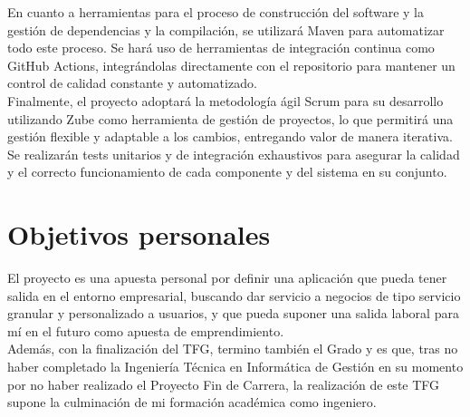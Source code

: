 En cuanto a herramientas para el proceso de construcción del software y la gestión de dependencias y la compilación, se utilizará Maven para automatizar todo este proceso. Se hará uso de herramientas de integración continua como GitHub Actions, integrándolas directamente con el repositorio para mantener un control de calidad constante y automatizado.\\

Finalmente, el proyecto adoptará la metodología ágil Scrum para su desarrollo utilizando Zube como herramienta de gestión de proyectos, lo que permitirá una gestión flexible y adaptable a los cambios, entregando valor de manera iterativa. Se realizarán tests unitarios y de integración exhaustivos para asegurar la calidad y el correcto funcionamiento de cada componente y del sistema en su conjunto.\\

\section{Objetivos personales}\label{objetivos-personales}
El proyecto es una apuesta personal por definir una aplicación que pueda tener salida en el entorno empresarial, buscando dar servicio a negocios de tipo servicio granular y personalizado a usuarios, y que pueda suponer una salida laboral para mí en el futuro como apuesta de emprendimiento.\\

Además, con la finalización del TFG, termino también el Grado y es que, tras no haber completado la Ingeniería Técnica en Informática de Gestión en su momento por no haber realizado el Proyecto Fin de Carrera, la realización de este TFG supone la culminación de mi formación académica como ingeniero.\\
